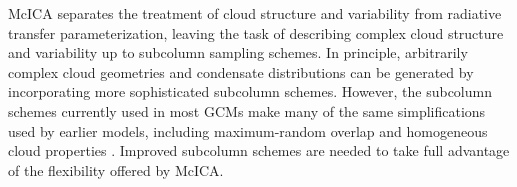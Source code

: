 McICA separates the treatment of cloud structure and variability from radiative transfer parameterization, leaving the task of describing complex cloud structure and variability up to subcolumn sampling schemes. In principle, arbitrarily complex cloud geometries and condensate distributions can be generated by incorporating more sophisticated subcolumn schemes. However, the subcolumn schemes currently used in most GCMs make many of the same simplifications used by earlier models, including maximum-random overlap and homogeneous cloud properties \citep[e.g.,][]{neale_et_al_2010a, neale_et_al_2010b}. Improved subcolumn schemes are needed to take full advantage of the flexibility offered by McICA.


